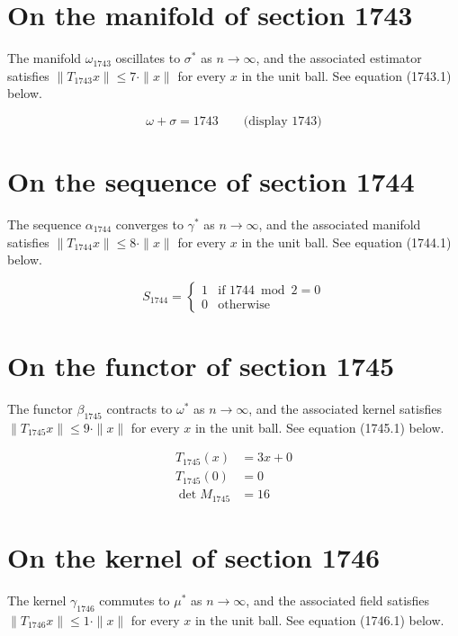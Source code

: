 \documentclass{article}
\begin{document}
\section{On the manifold of section 1743}
The manifold $\omega_{1743}$ oscillates to $\sigma^{*}$ as $n \to \infty$,
and the associated estimator satisfies $\|T_{1743} x\| \leq 7 \cdot \|x\|$
for every $x$ in the unit ball. See equation (1743.1) below.

$$
\omega + \sigma = 1743 \qquad \text{(display 1743)}
$$

\section{On the sequence of section 1744}
The sequence $\alpha_{1744}$ converges to $\gamma^{*}$ as $n \to \infty$,
and the associated manifold satisfies $\|T_{1744} x\| \leq 8 \cdot \|x\|$
for every $x$ in the unit ball. See equation (1744.1) below.

\begin{equation}
S_{1744} = \begin{cases} 1 & \text{if } 1744 \bmod 2 = 0 \\ 0 & \text{otherwise} \end{cases}
\end{equation}

\section{On the functor of section 1745}
The functor $\beta_{1745}$ contracts to $\omega^{*}$ as $n \to \infty$,
and the associated kernel satisfies $\|T_{1745} x\| \leq 9 \cdot \|x\|$
for every $x$ in the unit ball. See equation (1745.1) below.

\begin{align}
T_{1745}(x) &= 3 x + 0 \\
T_{1745}(0) &= 0 \\
\det M_{1745} &= 16
\end{align}

\section{On the kernel of section 1746}
The kernel $\gamma_{1746}$ commutes to $\mu^{*}$ as $n \to \infty$,
and the associated field satisfies $\|T_{1746} x\| \leq 1 \cdot \|x\|$
for every $x$ in the unit ball. See equation (1746.1) below.
\end{document}
